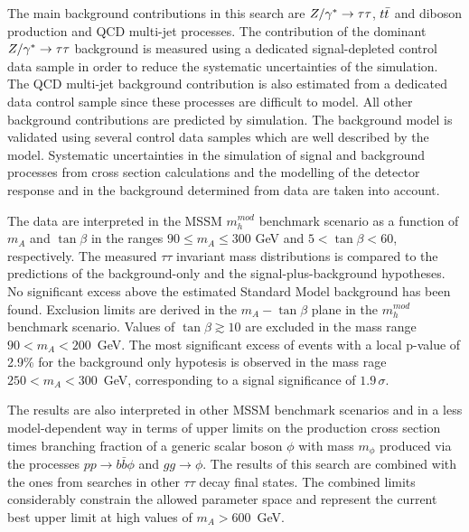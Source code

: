 The main background contributions in this search are $Z/\gamma^*\rightarrow \tau\tau$, $t\bar{t}$ and  diboson production and QCD multi-jet processes.
The contribution of the dominant $Z/\gamma^*\rightarrow \tau\tau$ background is measured using a dedicated  signal-depleted control data sample
in order to reduce the systematic uncertainties of the simulation. The QCD multi-jet background contribution 
is also estimated from a dedicated data control sample since these processes are difficult to model. All  other 
background contributions are predicted by simulation. 
The background model is validated using several control data samples which are well described by the model.
Systematic uncertainties in the simulation of signal and background processes
from cross section calculations and the modelling of the detector response and in the 
background determined from  data are taken into account.

The data are interpreted in the MSSM $m_h^{mod}$ benchmark scenario as a function of $m_A$ and $ \tan\beta$
in the ranges $90 \leq m_A \leq 300$ GeV and $5 < \tan\beta < 60$, respectively.
The measured $\tau\tau$ invariant mass distributions is compared to the predictions of the  background-only and the
signal-plus-background hypotheses. No significant excess above the estimated Standard 
Model background has been found. Exclusion limits are derived in the $m_A - \tan\beta$ plane 
in the $m_h^{mod}$ benchmark scenario. Values of $\tan\beta \apprge 10$ are excluded 
in the mass range $90 < m_A < 200$~GeV. 
The most significant excess of events with a  local p-value of 2.9\% for the background only hypotesis is observed in the mass rage $250< m_A <300$~GeV,
corresponding to a signal significance of $1.9\,\sigma$.


The results  are also interpreted in other MSSM benchmark scenarios and in a  less model-dependent 
way in terms of upper limits on the production cross section times branching fraction 
of a generic scalar boson $\phi$ with  mass  $m_\phi$ produced via the  processes 
$pp \rightarrow b\bar{b}\phi$ and $gg \rightarrow \phi$.
The results of this search are  combined with the ones from  searches in other $\tau\tau$ 
decay final states. The combined limits considerably constrain
the allowed parameter space and represent the current best upper limit at  high values of $m_A > 600$~GeV. 

